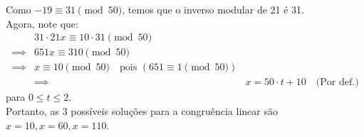 Como $-19 \equiv 31 \pmod{50}$, temos que o inverso modular de 21 é 31. \\
Agora, note que:
\begin{align*}
	&31 \cdot 21x \equiv 10 \cdot 31 \pmod{50} \\ \implies 
	&651x \equiv 310 \pmod{50} \\ \implies 
	&x \equiv 10 \pmod{50} \quad \text{pois $(651 \equiv 1 \pmod{50})$} \\ &\implies
	&x = 50 \cdot t + 10 \quad \text{(Por def.)}
\end{align*}
para $0 \leq t \leq 2$. \\
Portanto, as 3 possíveis soluções para a congruência linear são $x = 10, x = 60, x= 110$.

